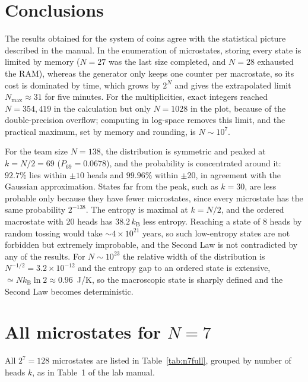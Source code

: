\documentclass[11pt,a4paper]{article}
\newcommand{\kB}{k_{\mathrm B}}
\begin{document}
\section{Conclusions}
The results obtained for the system of coins agree with the statistical picture described in the manual. In the enumeration of microstates, storing every state is limited by memory ($N=27$ was the last size completed, and $N=28$ exhausted the RAM), whereas the generator only keeps one counter per macrostate, so its cost is dominated by time, which grows by $2^N$ and gives the extrapolated limit $N_{\max}\approx31$ for five minutes.
For the multiplicities, exact integers reached $N=354,419$ in the calculation but only $N=1028$ in the plot, because of the double-precision overflow; computing in log-space removes this limit, and the practical maximum, set by memory and rounding, is $N\sim10^7$.

For the team size $N=138$, the distribution is symmetric and peaked at $k=N/2=69$ ($P_{69}=0.0678$), and the probability is concentrated around it: $92.7\%$ lies within $\pm10$ heads and $99.96\%$ within $\pm20$, in agreement with the Gaussian approximation. States far from the peak, such as $k=30$, are less probable only because they have fewer microstates, since every microstate has the same probability $2^{-138}$.
The entropy is maximal at $k=N/2$, and the ordered macrostate with 20 heads has $38.2\,\kB$ less entropy. Reaching a state of 8 heads by random tossing would take $\sim4\times10^{21}$ years, so such low-entropy states are not forbidden but extremely improbable, and the Second Law is not contradicted by any of the results.
For $N\sim10^{23}$ the relative width of the distribution is $N^{-1/2}=3.2\times10^{-12}$ and the entropy gap to an ordered state is extensive, $\simeq N\kB\ln2\approx0.96$~J/K, so the macroscopic state is sharply defined and the Second Law becomes deterministic.

\appendix
\section{All microstates for $N=7$}\label{app:n7}
All $2^7=128$ microstates are listed in Table~\ref{tab:n7full}, grouped by number of heads $k$, as in Table~1 of the lab manual.
\end{document}
